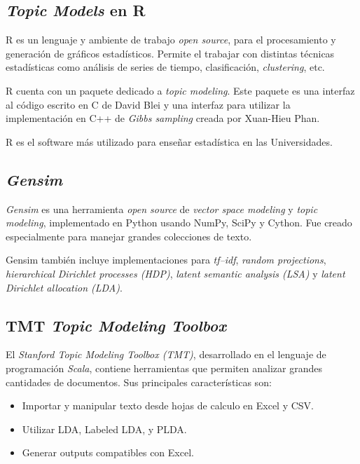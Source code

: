 \documentclass[12pt,oneside,letterpaper]{book}
\newcommand{\eng}[1]{\textit{#1}\xspace}			%
\newcommand{\abr}[1]{\textsc{#1}\xspace}           %
\theoremstyle{definition}
\begin{document}
\subsection{\eng{Topic Models} en \abr{R}}
 \label{sub:topic_models_r} 
\abr{R} es un lenguaje y ambiente de trabajo \eng{open source}, para el procesamiento y generación de gráficos estadísticos. Permite el trabajar con distintas técnicas estadísticas como análisis de series de tiempo, clasificación, \eng{clustering}, etc.

\abr{R} cuenta con un paquete dedicado a \eng{topic modeling}. Este paquete es una interfaz al código escrito en \abr{C} de David Blei y una interfaz para utilizar la implementación en \abr{C++} de \eng{Gibbs sampling} creada por Xuan-Hieu Phan.

R es el software más utilizado para enseñar estadística en las Universidades.

\subsection{\eng{Gensim}}
\label{sub:gensim}
\eng{Gensim} es una herramienta \eng{open source} de \eng{vector space modeling} y \eng{topic modeling}, implementado en Python usando NumPy, SciPy y Cython. Fue creado especialmente para manejar grandes colecciones de texto.

Gensim también incluye implementaciones para \eng{tf–idf}, \eng{random projections}, \eng{hierarchical Dirichlet processes (\abr{HDP})}, \eng{latent semantic analysis (\abr{LSA})} y \eng{latent Dirichlet allocation (\abr{LDA})}.

\subsection{\abr{TMT} \eng{Topic Modeling Toolbox}}
\label{sub:tmt}
El \eng{Stanford Topic Modeling Toolbox (\eng{TMT})}, desarrollado en el lenguaje de programación \eng{Scala}, contiene herramientas que permiten analizar grandes cantidades de documentos. Sus principales características son:

\begin{itemize}
	\setlength{\itemindent}{.1in}
	\item Importar y manipular texto desde hojas de calculo en Excel y CSV.
	\item Utilizar LDA, Labeled LDA, y PLDA.
	\item Generar outputs compatibles con Excel.
\end{itemize}
\end{document}
